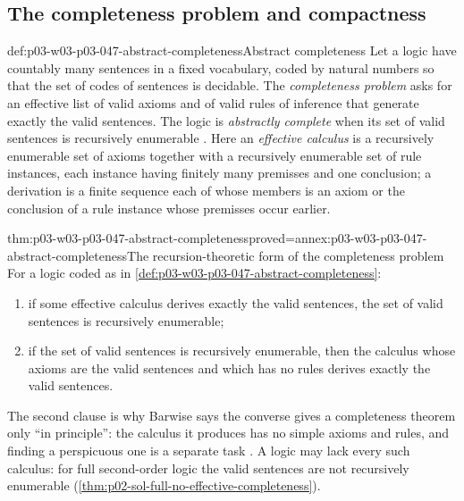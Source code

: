 \subsection{The completeness problem and compactness}

\begin{hbdefinition}{def:p03-w03-p03-047-abstract-completeness}{Abstract completeness}
Let a logic have countably many sentences in a fixed vocabulary, coded by
natural numbers so that the set of codes of sentences is decidable.  The
\emph{completeness problem} asks for an effective list of valid axioms and
of valid rules of inference that generate exactly the valid sentences.  The
logic is \emph{abstractly complete} when its set of valid sentences is
recursively enumerable \cite[Ch.~I, \S1.3, pp.~6--7]{Barwise1985BackgroundAims}.
Here an \emph{effective calculus} is a recursively enumerable set of axioms
together with a recursively enumerable set of rule instances, each instance
having finitely many premisses and one conclusion; a derivation is a finite
sequence each of whose members is an axiom or the conclusion of a rule
instance whose premisses occur earlier.
\end{hbdefinition}

\begin{hbtheorem}{thm:p03-w03-p03-047-abstract-completeness}{proved=annex:p03-w03-p03-047-abstract-completeness}{The recursion-theoretic form of the completeness problem}
For a logic coded as in \cref{def:p03-w03-p03-047-abstract-completeness}:
\begin{enumerate}
 \item if some effective calculus derives exactly the valid sentences, the
       set of valid sentences is recursively enumerable;
 \item if the set of valid sentences is recursively enumerable, then the
       calculus whose axioms are the valid sentences and which has no rules
       derives exactly the valid sentences.
\end{enumerate}
\end{hbtheorem}

The second clause is why Barwise says the converse gives a completeness
theorem only ``in principle'': the calculus it produces has no simple axioms
and rules, and finding a perspicuous one is a separate task
\cite[Ch.~I, \S1.3, p.~7]{Barwise1985BackgroundAims}.  A logic may lack every
such calculus: for full second-order logic the valid sentences are not
recursively enumerable (\cref{thm:p02-sol-full-no-effective-completeness}).

